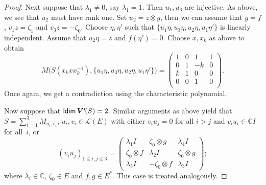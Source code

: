 \documentclass[a4paper,12pt,reqno]{amsart}
\numberwithin{equation}{section}
\theoremstyle{definition}
\begin{document}
\begin{proof}
Next suppose that $\lambda_1 \neq 0$, say $\lambda_1=1$. Then $u_1, u_3$ are injective.
As above, we see that $u_2$ must have rank one. Set $u_2= z \otimes g$, then we can assume that $g=f$, $v_1 z = \zeta_1$
and $v_3 z= - \zeta_0$. Choose $\eta, \eta'$ such that $\{u_1 \eta, u_3 \eta, u_2 \eta, u_1 \eta'\}$ is linearly independent.
Assume that $u_2 \eta=z$ and $f(\eta')=0$.
Choose $x, x_k$ as above to obtain
\begin{equation*}
M\bigl({S} (x_k x x_k^{-1}), \{u_1 \eta, u_3 \eta, u_2 \eta, u_1 \eta'\}\bigr)= \left(
                                                                      \begin{array}{cccc}
                                                                        1 & 0 & 1 & 1 \\
                                                                        0 & 1 & -k & 0 \\
                                                                        k & 1 & 0 & 0 \\
                                                                        0 & 0 & 1 & 0 \\
                                                                      \end{array}
                                                                    \right).
\end{equation*}
Once again, we get a contradiction using the characteristic polynomial.

Now suppose that ${{\sf ldim}\,}{{\bm{V'}\mkern-2.5mu(S)}}=2$. Similar arguments as above yield that
${S}= \sum_{i=1}^3 M_{u_i,v_i}$, $u_i, v_i \in {{\mathscr L}(E)}$ with either
$v_i u_j=0$ for all $i > j$ and $v_i u_i \in {\mathbb{C}} I$ for all~$i$, or
\begin{equation*}
(v_iu_j)_{1 \leq i,j \leq 3}= \left(\begin{array}{ccc}
                                             \lambda_{1} I & \zeta_0 \otimes g  & \lambda_4 I\\
                                             \zeta_0 \otimes f & \lambda_2 I & \zeta_0 \otimes g \\
                                             \lambda_5 I & - \zeta_0 \otimes f &\lambda_3 I
                                           \end{array}\right);
\end{equation*}
where $  \lambda_i  \in {\mathbb{C}}$, $\zeta_0 \in E$ and  $f, g \in E^*$. This case is treated analogously.


\end{proof}
\end{document}
